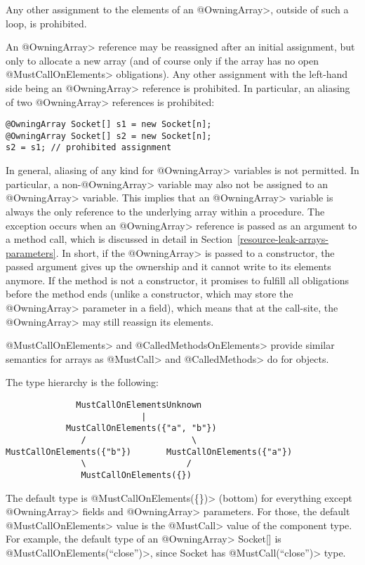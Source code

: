 \noindent Any other assignment to the elements of an \<@OwningArray>, outside of such a loop, is prohibited.

An \<@OwningArray> reference may be reassigned after an initial assignment, but only to allocate a new array (and of course only if the array has no open \<@MustCallOnElements> obligations). Any other assignment with the left-hand side being an \<@OwningArray> reference is prohibited. In particular, an aliasing of two \<@OwningArray> references is prohibited:

\begin{verbatim}
@OwningArray Socket[] s1 = new Socket[n];
@OwningArray Socket[] s2 = new Socket[n];
s2 = s1; // prohibited assignment
\end{verbatim}

In general, aliasing of any kind for \<@OwningArray> variables is not permitted. In particular, a non-\<@OwningArray> variable may also not be assigned to an \<@OwningArray> variable. This implies that an \<@OwningArray> variable is always the only reference to the underlying array within a procedure. The exception occurs when an \<@OwningArray> reference is passed as an argument to a method call, which is discussed in detail in Section~\ref{resource-leak-arrays-parameters}. In short, if the \<@OwningArray> is passed to a constructor, the passed argument gives up the ownership and it cannot write to its elements anymore. If the method is not a constructor, it promises to fulfill all obligations before the method ends (unlike a constructor, which may store the \<@OwningArray> parameter in a field), which means that at the call-site, the \<@OwningArray> may still reassign its elements.

\<@MustCallOnElements> and \<@CalledMethodsOnElements> provide similar semantics for arrays as \<@MustCall> and \<@CalledMethods> do for objects.

The type hierarchy is the following:

\begin{verbatim}
              MustCallOnElementsUnknown
                           |
            MustCallOnElements({"a", "b"})
               /                     \
MustCallOnElements({"b"})       MustCallOnElements({"a"})
               \                    /
               MustCallOnElements({})
\end{verbatim}
The default type is \<@MustCallOnElements(\{\})> (bottom) for everything except \<@OwningArray> fields and \<@OwningArray> parameters. For those, the default \<@MustCallOnElements> value is the \<@MustCall> value of the component type. For example, the default type of an \<@OwningArray> Socket[] is \<@MustCallOnElements({``close''})>, since Socket has \<@MustCall(``close'')> type.

